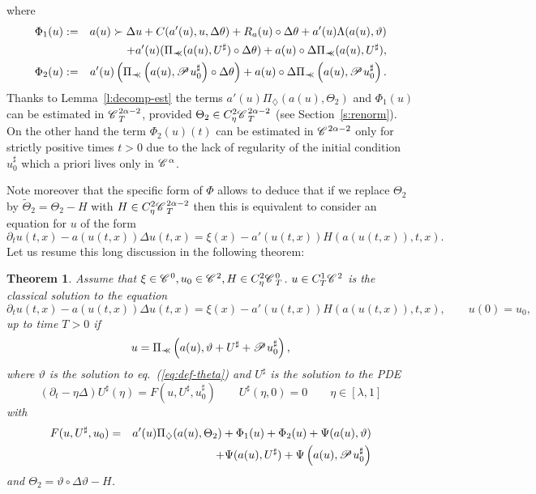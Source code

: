 \documentclass{amsart}
\newcommand{\assign}{:=}
\newcommand{\nocomma}{}
\newcommand{\precprec}{\prec\!\!\!\prec}
\newtheorem{theorem}{Theorem}
\theoremstyle{remark}
\theoremstyle{definition}
\newcommand{\CC}{\mathscr{C} \hspace{.1em}}
\newcommand{\PP}{\mathscr{P} \hspace{.1em}}
\begin{document}
where
\begin{eqnarray*}
  \Phi_1 (u) & \assign & a (u) \succ \Delta u + C (a' (u), u, \Delta \theta) +
  R_a (u) \circ \Delta \theta + a' (u) \Lambda (a (u), \vartheta)\\
  &  & + a' (u) (\Pi_{\precprec} (a (u), U^{\sharp}) \circ \Delta \theta) + a
  (u) \circ \Delta \Pi_{\precprec} (a (u), U^{\sharp}),\\
  \Phi_2 (u) & \assign & a' (u) \left( \Pi_{\precprec} \left( a (u), \PP
  u_0^{\sharp} \right) \circ \Delta \theta \right) + a (u) \circ \Delta
  \Pi_{\precprec} \left( a (u), \PP u_0^{\sharp} \right) .
\end{eqnarray*}
Thanks to Lemma~\ref{l:decomp-est} the terms $a' (u) \Pi_{\diamondsuit} (a
(u), \Theta_2)$ and $\Phi_1 (u)$ can be estimated in $\CC^{2 \alpha - 2}_T$,
provided $\Theta_2 \in C^2_{\eta} \CC^{2 \alpha - 2}_T$ (see
Section~\ref{s:renorm}). On the other hand the term $\Phi_2 (u) (t)$ can be
estimated in $\CC^{2 \alpha - 2}$ only for strictly positive times $t > 0$ due
to the lack of regularity of the initial condition $u_0^{\sharp}$ which a
priori lives only in $\CC^{\alpha}$.

Note moreover that the specific form of $\Phi$ allows to deduce that if we
replace $\Theta_2$ by $\tilde{\Theta}_2 = \Theta_2 - H$ with $H \in C_{\eta}^2
\CC^{2 \alpha - 2}_T$ then this is equivalent to consider an equation for $u$
of the form
\[ \partial_t u (t, x) - a (u (t, x)) \Delta u (t, x) = \xi (x) - a' (u (t,
   x)) H (a (u (t, x)), t, x) . \]
Let us resume this long discussion in the following theorem:

\begin{theorem}
  \label{th:identification}Assume that $\xi \in \CC^0, u_0 \in \CC^2, H \in
  C_{\eta}^2 \CC_T^0$. $u \in C^1_T \CC^2$ is the classical solution to the
  equation
  \begin{equation}
    \partial_t u (t, x) - a (u (t, x)) \Delta u (t, x) = \xi (x) - a' (u (t,
    x)) H (a (u (t, x)), t, x), \qquad u (0) = u_0, \label{eq:pde}
  \end{equation}
  up to time $T > 0$ if
  \[ u = \Pi_{\precprec} \left( a (u), \vartheta + U^{\sharp} + \PP
     u_0^{\sharp} \right), \]
  where $\vartheta$ is the solution to eq.~(\ref{eq:def-theta}) and
  $U^{\sharp}$ is the solution to the PDE
  \begin{equation}
    (\partial_t - \eta \Delta) U^{\sharp} (\eta) = F (u, U^{\sharp},
    u_0^{\sharp}) \qquad U^{\sharp} (\eta, 0) = 0 \qquad \eta \in [\lambda, 1]
    \label{eq:pde-sharp}
  \end{equation}
  with
  \begin{eqnarray*}
    F (u, U^{\sharp}, u_0) & = & a' (u) \Pi_{\nocomma \diamondsuit} (a (u),
    \Theta_2) + \Phi_1 (u) + \Phi_2 (u) + \Psi (a (u), \vartheta)\\
    &  & + \Psi (a (u), U^{\sharp}) + \Psi \left( a (u), \PP u_0^{\sharp}
    \right)
  \end{eqnarray*}
  and $\Theta_2 = \vartheta \circ \Delta \vartheta - H$.
\end{theorem}
\end{document}
